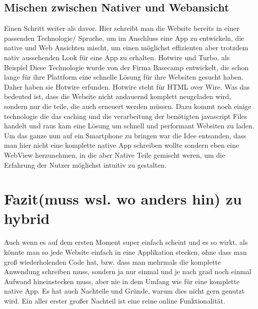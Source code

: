 \subsection{Mischen zwischen Nativer und Webansicht}
Einen Schritt weiter als davor. Hier schreibt man die Website bereits in einer passenden Technologie/ Sprache, um im Anschluss eine App zu entwickeln, die native und Web Ansichten mischt, um einen möglichst effizienten aber trotzdem nativ aussehenden Look für eine App zu erhalten. Hotwire und Turbo. als Beispiel
Diese Technologie wurde von der Firma Basecamp entwickelt, die schon lange für ihre Plattform eine schnelle Lösung für ihre Websiten gesucht haben. Daher haben sie Hotwire erfunden. Hotwire steht für HTML over Wire. Was das bedeuted ist, dass die Website nicht andauernd komplett neugeladen wird, sondern nur die teile, die auch erneuert werden müssen. Dazu kommt noch einige technologie die das caching und die verarbeitung der benötigten javascript Files handelt und raus kam eine Lösung um schnell und performant Websiten zu laden.
Um das ganze nun auf ein Smartphone zu bringen war die Idee entsanden, dass man hier nicht eine komplette native App schreiben wollte sondern eben eine WebView herzunehmen, in die aber Native Teile gemischt weren, um die Erfahrung der Nutzer möglichst intuitiv zu gestalten. 





\section{Fazit(muss wsl. wo anders hin) zu hybrid}
Auch wenn es auf dem ersten Moment super einfach scheint und es so wirkt, als könnte man so jede Website einfach in eine Applikation stecken, ohne dass man groß wiederholenden Code hat, bzw. dass man mehrmals die komplette Anwendung schreiben muss, sondern ja nur einmal und je nach grad noch einmal Aufwand hineinstecken muss, aber nie in dem Umfang wie für eine komplette native App. 
Es hat auch Nachteile und Gründe, warum dies nicht gern genutzt wird.
Ein aller erster großer Nachteil ist eine reine online Funktionalität. 